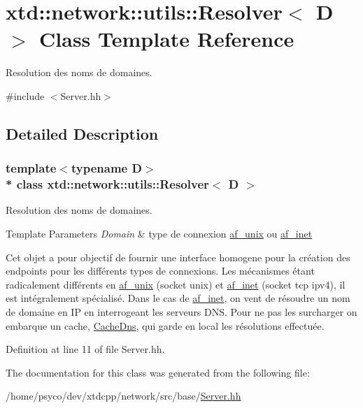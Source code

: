\hypertarget{classxtd_1_1network_1_1utils_1_1Resolver}{}\section{xtd\+:\+:network\+:\+:utils\+:\+:Resolver$<$ D $>$ Class Template Reference}
\label{classxtd_1_1network_1_1utils_1_1Resolver}


Resolution des noms de domaines.  




{\ttfamily \#include $<$Server.\+hh$>$}



\subsection{Detailed Description}
\subsubsection*{template$<$typename D$>$\\*
class xtd\+::network\+::utils\+::\+Resolver$<$ D $>$}

Resolution des noms de domaines. 


\begin{DoxyTemplParams}{Template Parameters}
{\em Domain} & type de connexion \hyperlink{namespacextd_1_1network_1_1utils_a60e83921a2d026f07b49fa094988acdf}{af\+\_\+unix} ou \hyperlink{namespacextd_1_1network_1_1utils_a6238bab7a616eda8c9424721444a18d1}{af\+\_\+inet}\\
\hline
\end{DoxyTemplParams}
Cet objet a pour objectif de fournir une interface homogene pour la création des endpoints pour les différents types de connexions. Les mécanismes étant radicalement différents en \hyperlink{namespacextd_1_1network_1_1utils_a60e83921a2d026f07b49fa094988acdf}{af\+\_\+unix} (socket unix) et \hyperlink{namespacextd_1_1network_1_1utils_a6238bab7a616eda8c9424721444a18d1}{af\+\_\+inet} (socket tcp ipv4), il est intégralement spécialisé. Dans le cas de \hyperlink{namespacextd_1_1network_1_1utils_a6238bab7a616eda8c9424721444a18d1}{af\+\_\+inet}, on vent de résoudre un nom de domaine en IP en interrogeant les serveurs D\+NS. Pour ne pas les surcharger on embarque un cache, \hyperlink{classxtd_1_1network_1_1utils_1_1CacheDns}{Cache\+Dns}, qui garde en local les résolutions effectuée. 

Definition at line 11 of file Server.\+hh.



The documentation for this class was generated from the following file\+:\begin{DoxyCompactItemize}
\item 
/home/psyco/dev/xtdcpp/network/src/base/\hyperlink{base_2Server_8hh}{Server.\+hh}\end{DoxyCompactItemize}
